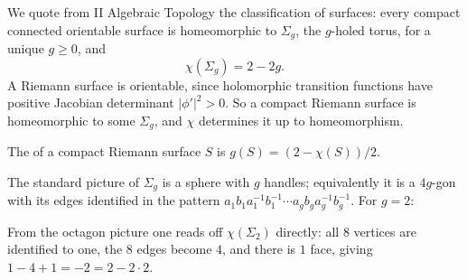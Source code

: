 \documentclass[a4paper]{scrartcl}
\begin{document}
We quote from II Algebraic Topology the classification of surfaces: every compact
connected orientable surface is homeomorphic to $\Sigma_g$, the $g$-holed torus, for a
unique $g \geq 0$, and
$$
\chi(\Sigma_g) = 2 - 2g.
$$
A Riemann surface is orientable, since holomorphic transition functions have positive
Jacobian determinant $|\phi'|^2 > 0$. So a compact Riemann surface is homeomorphic to some
$\Sigma_g$, and $\chi$ determines it up to homeomorphism.

\begin{definition}[Genus]
	The  of a compact Riemann surface $S$ is $g(S) = (2 - \chi(S))/2$.
\end{definition}

The standard picture of $\Sigma_g$ is a sphere with $g$ handles; equivalently it is a
$4g$-gon with its edges identified in the pattern
$a_1b_1a_1^{-1}b_1^{-1}\cdots a_gb_ga_g^{-1}b_g^{-1}$. For $g = 2$:

\begin{center}
\end{center}

From the octagon picture one reads off $\chi(\Sigma_2)$ directly: all $8$ vertices are
identified to one, the $8$ edges become $4$, and there is $1$ face, giving
$1 - 4 + 1 = -2 = 2 - 2\cdot 2$.
\end{document}
